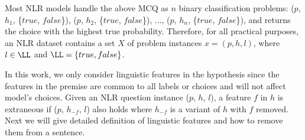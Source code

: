 %
Most NLR models handle the above MCQ as $n$ binary classification problems: 
($p$, $h_1$, \{$true$, $false$\}), ($p$, $h_2$, \{$true$, $false$\}), ..., ($p$, $h_n$, \{$true$, $false$\}), 
and returns the choice with the highest true probability. Therefore, for all practical purposes,
an NLR dataset contains a set $X$ of problem instances $x = (p, h, l)$, where $l \in \LL$ and $\LL = \{true, false\}$.

In this work, we only consider linguistic features in the hypothesis since the features in the premise  
are common to all labels or choices and will not affect model's choices. 
Given an NLR question instance ($p$, $h$, $l$), a feature $f$ in $h$ is extraneous if 
($p$, $h_{-f}$, $l$) also holds where $h_{-f}$ is a variant of $h$ with $f$ removed.
Next we will give detailed definition of linguistic features and how to remove them from a sentence.

